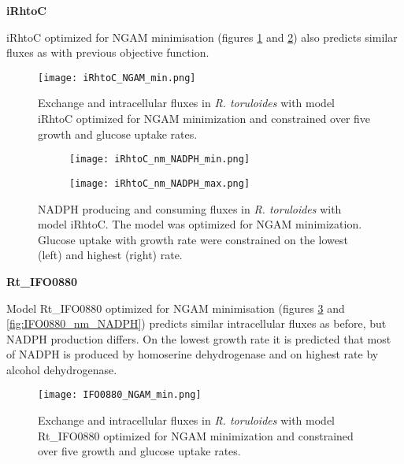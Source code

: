 \textbf{iRhtoC}

iRhtoC optimized for NGAM minimisation (figures \ref{fig:iRhtoC_NGAM_min} and \ref{fig:iRhtoC_nm_NADPH}) also predicts similar fluxes as with 
previous objective function. 

\begin{figure}[h!]
    \centering
    \texttt{[image: iRhtoC\_NGAM\_min.png]}
    \caption{Exchange and intracellular fluxes in \textit{R. toruloides} with model iRhtoC optimized for NGAM minimization 
    and constrained over five growth and glucose uptake rates.}
    \label{fig:iRhtoC_NGAM_min}

\end{figure}


\begin{figure}[h!]
    \centering
    \begin{subfigure}[h!]{0.49\textwidth}
        \centering
        \texttt{[image: iRhtoC\_nm\_NADPH\_min.png]}
    \end{subfigure}
    \hfill
    \begin{subfigure}[h!]{0.49\textwidth}
        \centering
        \texttt{[image: iRhtoC\_nm\_NADPH\_max.png]}
    \end{subfigure}
    \caption{NADPH producing and consuming fluxes in \textit{R. toruloides} with model iRhtoC. The model was optimized for NGAM minimization. 
    Glucose uptake with growth rate were constrained on the lowest (left) and highest (right) rate.}
    \label{fig:iRhtoC_nm_NADPH}
\end{figure}



\textbf{Rt\_IFO0880}

Model Rt\_IFO0880 optimized for NGAM minimisation (figures \ref{fig:IFO0880_NGAM_min} and \ref{fig:IFO0880_nm_NADPH}) predicts similar intracellular
fluxes as before, but NADPH production differs. On the lowest growth rate it is predicted that most of NADPH is produced by homoserine dehydrogenase 
and on highest rate by alcohol dehydrogenase. 


\begin{figure}[h!]
    \centering
    \texttt{[image: IFO0880\_NGAM\_min.png]}
    \caption{Exchange and intracellular fluxes in \textit{R. toruloides} with model Rt\_IFO0880 optimized for NGAM minimization 
    and constrained over five growth and glucose uptake rates.}
    \label{fig:IFO0880_NGAM_min}
\end{figure}

